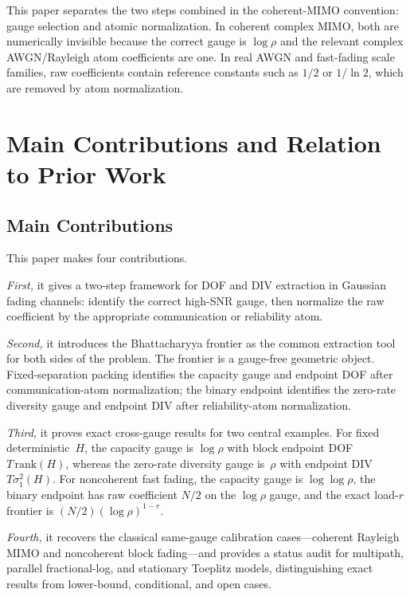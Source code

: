 \documentclass[lettersize,onecolumn]{IEEEtran}
\newcommand{\snr}{\rho}
\begin{document}
This paper separates the two steps combined in the coherent-MIMO
convention: gauge selection and atomic normalization. In coherent
complex MIMO, both are numerically invisible because the correct gauge
is $\log\snr$ and the relevant complex AWGN/Rayleigh atom
coefficients are one. In real AWGN and fast-fading scale families, raw
coefficients contain reference constants such as $1/2$ or $1/\ln 2$,
which are removed by atom normalization.

\section{Main Contributions and Relation to Prior Work}\label{sec:contributions}

\subsection{Main Contributions}

This paper makes four contributions.

\emph{First,} it gives a two-step framework for DOF and DIV
extraction in Gaussian fading channels: identify the correct high-SNR
gauge, then normalize the raw coefficient by the appropriate
communication or reliability atom.

\emph{Second,} it introduces the Bhattacharyya frontier as the common
extraction tool for both sides of the problem.  The frontier is a
gauge-free geometric object.  Fixed-separation packing identifies the
capacity gauge and endpoint DOF after communication-atom
normalization; the binary endpoint identifies the zero-rate diversity
gauge and endpoint DIV after reliability-atom normalization.

\emph{Third,} it proves exact cross-gauge results for two central
examples.  For fixed deterministic~$H$, the capacity gauge is
$\log\snr$ with block endpoint DOF $T\,\mathrm{rank}(H)$, whereas the
zero-rate diversity gauge is~$\snr$ with endpoint DIV
$T\sigma_1^2(H)$.  For noncoherent fast fading, the capacity gauge is
$\log\log\snr$, the binary endpoint has raw coefficient $N/2$ on the
$\log\snr$ gauge, and the exact load-$r$ frontier is
$(N/2)(\log\snr)^{1-r}$.

\emph{Fourth,} it recovers the classical same-gauge calibration
cases---coherent Rayleigh MIMO and noncoherent block fading---and
provides a status audit for multipath, parallel fractional-log, and
stationary Toeplitz models, distinguishing exact results from
lower-bound, conditional, and open cases.
\end{document}
